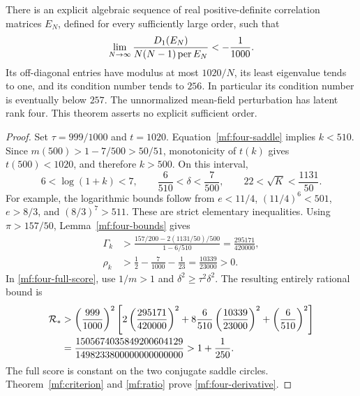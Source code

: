 \begin{theorem}
\label{mf:257}
There is an explicit algebraic sequence of real positive-definite
correlation matrices \(E_N\), defined for every sufficiently large order,
such that
\begin{equation}\label{mf:four-derivative}
 \lim_{N\to\infty}
 \frac{D_1(E_N)}{N(N-1)\operatorname{per} E_N}<-\frac1{1000}.
\end{equation}
Its off-diagonal entries have modulus at most \(1020/N\), its least
eigenvalue tends to one, and its condition number tends to \(256\).
In particular its condition number is eventually below \(257\).
The unnormalized mean-field perturbation has latent rank four.
This theorem asserts no explicit sufficient order.
\end{theorem}
\begin{proof}
Set \(\tau=999/1000\) and \(t=1020\).
Equation~\eqref{mf:four-saddle} implies \(k<510\).
Since \(m(500)>1-7/500>50/51\), monotonicity of \(t(k)\) gives
\(t(500)<1020\), and therefore \(k>500\).
On this interval,
\[
 6<\log(1+k)<7,\qquad
 \frac6{510}<\delta<\frac7{500},\qquad
 22<\sqrt K<\frac{1131}{50}.
\]
For example, the logarithmic bounds follow from
\(e<11/4\), \((11/4)^6<501\), \(e>8/3\), and
\((8/3)^7>511\). These are strict elementary inequalities.
Using \(\pi>157/50\), Lemma~\ref{mf:four-bounds} gives
\begin{align*}
 \Gamma_k
 &>\frac{157/200-2(1131/50)/500}{1-6/510}
   =\frac{295171}{420000},\\
 \rho_k
 &>\frac12-\frac7{1000}-\frac1{23}
   =\frac{10339}{23000}>0.
\end{align*}
In \eqref{mf:four-full-score}, use \(1/m>1\) and
\(\delta^2\ge\tau^2\delta^2\). The resulting entirely rational bound is
\begin{align}
 \mathcal R_*
 &>\left(\frac{999}{1000}\right)^2
 \left[
 2\left(\frac{295171}{420000}\right)^2
 +8\frac6{510}\left(\frac{10339}{23000}\right)^2
 +\left(\frac6{510}\right)^2
 \right]\notag\\
 &=\frac{1505674035849200604129}
         {1498233800000000000000}
 >1+\frac1{250}.\label{mf:four-rational-margin}
\end{align}
The full score is constant on the two conjugate saddle circles.
Theorem~\ref{mf:criterion} and \eqref{mf:ratio} prove
\eqref{mf:four-derivative}.


\end{proof}
